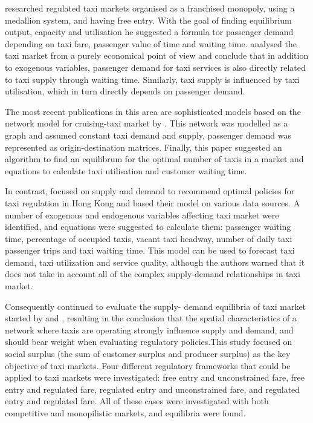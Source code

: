 \textcite{Devany1975taxi+capacity} researched regulated taxi markets organised
as a franchised monopoly, using a medallion system, and having free entry. With
the goal of finding equilibrium output, capacity and utilisation he suggested a
formula tor passenger demand depending on taxi fare, passenger value of time
and waiting time. \textcite{Manski1967taxi+demand} analysed the taxi market
from a purely economical point of view and conclude that in addition to
exogenous variables, passenger demand for taxi services is also directly
related to taxi supply through waiting time. Similarly, taxi supply is
influenced by taxi utilisation, which in turn directly depends on passenger
demand.

The most recent publications in this area are sophisticated models based on the
network model for cruising-taxi market by \textcite{Yang1998taxi+network}. This
network was modelled as a graph and assumed constant taxi demand and supply,
passenger demand was represented as origin-destination matrices. Finally, this
paper suggested an algorithm to find an equilibrum for the optimal number of
taxis in a market and equations to calculate taxi utilisation and customer
waiting time.

In contrast, \textcite{Yang2000taxi+utilization} focused on supply and demand
to recommend optimal policies for taxi regulation in Hong Kong and based their
model on various data sources. A number of exogenous and endogenous variables
affecting taxi market were identified, and equations were suggested to
calculate them: passenger waiting time, percentage of occupied taxis, vacant
taxi headway, number of daily taxi passenger trips and taxi waiting time. This
model can be used to forecast taxi demand, taxi utilization and service
quality, although the authors warned that it does not take in account all of
the complex supply-demand relationships in taxi market.

Consequently \textcite{Yang2002taxi+demand} continued to evaluate the supply-
demand equilibria of taxi market started by \textcite{Yang1998taxi+network} and
\textcite{Yang2000taxi+utilization}, resulting in the conclusion that the
spatial characteristics of a network where taxis are operating strongly
influence supply and demand, and should bear weight when evaluating regulatory
policies.This study focused on social surplus (the sum of customer surplus and
producer surplus) as the key objective of taxi markets. Four different
regulatory frameworks that could be applied to taxi markets were investigated:
free entry and unconstrained fare, free entry and regulated fare, regulated
entry and unconstrained fare, and regulated entry and regulated fare. All of
these cases were investigated with both competitive and monopilistic markets,
and equilibria were found.


